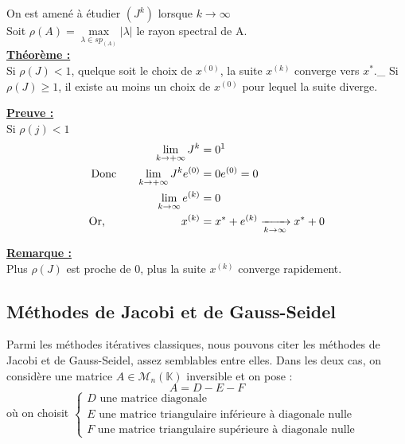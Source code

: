 On est amené à étudier $\left(J^k\right)$ lorsque $k \to \infty$\\

Soit $\rho(A) = \underset{\lambda \in sp_{(A)}}{\max}\left|\lambda\right|$ le rayon spectral de A.\\
\noindent\textbf{\underline{Théorème :}}\\
Si $\rho(J) < 1$, quelque soit le choix de $x^{(0)}$, la suite $x^{(k)}$ converge vers $x^*$.\_
Si $\rho(J) \geq 1$, il existe au moins un choix de $x^{(0)}$ pour lequel la suite diverge.

\noindent\textbf{\underline{Preuve :}}\\
Si $\rho(j) < 1$ \\
\begin{align*}
\lim\limits_{k \to +\infty} J^k &= 0 \text{\footnotemark}\\
\text{Donc } \hspace{15pt} \lim\limits_{k \to +\infty} J^ke^{(0)} &= 0e^{(0)} = 0\\
\lim\limits_{k \to \infty} e^{(k)} &= 0\\
\text{Or, } \hspace{65pt} x^{(k)} &= x^* + e^{(k)} \xrightarrow[k\to \infty]{}x^* + 0 
\end{align*}

\noindent\textbf{\underline{Remarque :}}\\
Plus $\rho(J)$ est proche de 0, plus la suite $x^{(k)}$ converge rapidement.\\


\subsection{Méthodes de Jacobi et de Gauss-Seidel}
Parmi les méthodes itératives classiques, nous pouvons citer les méthodes de Jacobi et de Gauss-Seidel, assez semblables entre elles. Dans les deux cas, on considère une matrice $A \in \mathcal{M}_n(\mathbb{K})$ inversible et on pose : $$A = D-E-F$$
où on choisit $\begin{cases}
	D \text{ une matrice diagonale}\\
	E \text{ une matrice triangulaire inférieure à diagonale nulle}\\
	F \text{ une matrice triangulaire supérieure à diagonale nulle}
\end{cases}$\\

